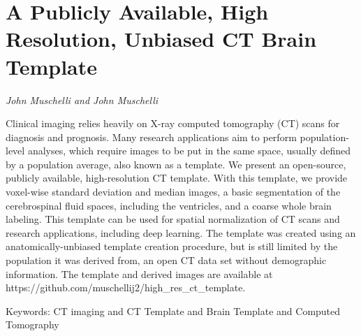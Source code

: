 \documentclass[../booklet.tex]{subfiles}
\begin{document}
\section[A Publicly Available, High Resolution, Unbiased CT Brain Template. {\it John Muschelli and John Muschelli}]{A Publicly Available, High Resolution, Unbiased CT Brain Template}
 

\begin{center}
  {\it John Muschelli and John Muschelli}
\end{center}

\vskip 0.8cm


  Clinical imaging relies heavily on X-ray computed tomography (CT) scans for diagnosis and prognosis. Many research applications aim to perform population-level analyses, which require images to be put in the same space, usually defined by a population average, also known as a template. We present an open-source, publicly available, high-resolution CT template. With this template, we provide voxel-wise standard deviation and median images, a basic segmentation of the cerebrospinal fluid spaces, including the ventricles, and a coarse whole brain labeling. This template can be used for spatial normalization of CT scans and research applications, including deep learning. The template was created using an anatomically-unbiased template creation procedure, but is still limited by the population it was derived from, an open CT data set without demographic information. The template and derived images are available at https://github.com/muschellij2/high\_res\_ct\_template.

  Keywords: CT imaging and CT Template and Brain Template and Computed Tomography
  
\end{document}
